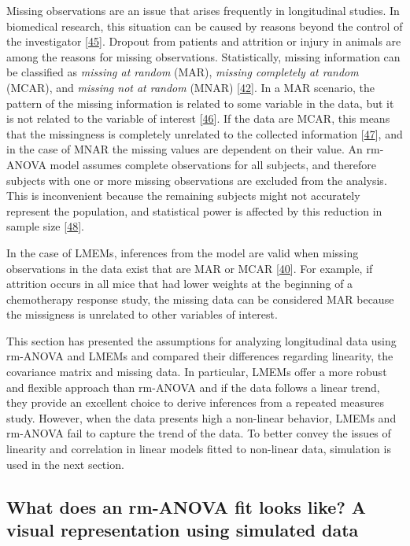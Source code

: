 \documentclass[
]{article}
\begin{document}
Missing observations are an issue that arises frequently in longitudinal studies. In biomedical research, this situation can be caused by reasons beyond the control of the investigator {[}\protect\hyperlink{ref-molenberghs2004}{45}{]}. Dropout from patients and attrition or injury in animals are among the reasons for missing observations. Statistically, missing information can be classified as \emph{missing at random} (MAR), \emph{missing completely at random} (MCAR), and \emph{missing not at random} (MNAR) {[}\protect\hyperlink{ref-weiss2005}{42}{]}. In a MAR scenario, the pattern of the missing information is related to some variable in the data, but it is not related to the variable of interest {[}\protect\hyperlink{ref-scheffer2002}{46}{]}. If the data are MCAR, this means that the missingness is completely unrelated to the collected information {[}\protect\hyperlink{ref-potthoff2006}{47}{]}, and in the case of MNAR the missing values are dependent on their value. An rm-ANOVA model assumes complete observations for all subjects, and therefore subjects with one or more missing observations are excluded from the analysis. This is inconvenient because the remaining subjects might not accurately represent the population, and statistical power is affected by this reduction in sample size {[}\protect\hyperlink{ref-ma2012}{48}{]}.

In the case of LMEMs, inferences from the model are valid when missing observations in the data exist that are MAR or MCAR {[}\protect\hyperlink{ref-west2014}{40}{]}. For example, if attrition occurs in all mice that had lower weights at the beginning of a chemotherapy response study, the missing data can be considered MAR because the missigness is unrelated to other variables of interest.

This section has presented the assumptions for analyzing longitudinal data using rm-ANOVA and LMEMs and compared their differences regarding linearity, the covariance matrix and missing data. In particular, LMEMs offer a more robust and flexible approach than rm-ANOVA and if the data follows a linear trend, they provide an excellent choice to derive inferences from a repeated measures study. However, when the data presents high a non-linear behavior, LMEMs and rm-ANOVA fail to capture the trend of the data. To better convey the issues of linearity and correlation in linear models fitted to non-linear data, simulation is used in the next section.

\hypertarget{simulation}{%
\subsection{What does an rm-ANOVA fit looks like? A visual representation using simulated data}\label{simulation}}
\end{document}
